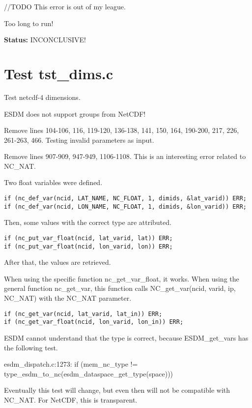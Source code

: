 //TODO This error is out of my league.

Too long to run!

{\bf \large Status: } INCONCLUSIVE!

\section{Test tst\_dims.c}

Test netcdf-4 dimensions.

ESDM does not support groups from NetCDF!

Remove lines 104-106, 116, 119-120, 136-138, 141, 150, 164, 190-200, 217, 226, 261-263, 466. Testing invalid parameters as input.

Remove lines 907-909, 947-949, 1106-1108. This is an interesting error related to NC\_NAT.

Two float variables were defined.

\begin{verbatim}
if (nc_def_var(ncid, LAT_NAME, NC_FLOAT, 1, dimids, &lat_varid)) ERR;
if (nc_def_var(ncid, LON_NAME, NC_FLOAT, 1, dimids, &lon_varid)) ERR;
\end{verbatim}

Then, some values with the correct type are attributed.

\begin{verbatim}
if (nc_put_var_float(ncid, lat_varid, lat)) ERR;
if (nc_put_var_float(ncid, lon_varid, lon)) ERR;
\end{verbatim}

After that, the values are retrieved.

When using the specific function nc\_get\_var\_float, it works. When using the general function nc\_get\_var, this function calls NC\_get\_var(ncid, varid, ip, NC\_NAT) with the NC\_NAT parameter.

\begin{verbatim}
if (nc_get_var(ncid, lat_varid, lat_in)) ERR;
if (nc_get_var_float(ncid, lon_varid, lon_in)) ERR;
\end{verbatim}

ESDM cannot understand that the type is correct, because ESDM\_get\_vars has the following test.

esdm\_dispatch.c:1273: if (mem\_nc\_type != type\_esdm\_to\_nc(esdm\_dataspace\_get\_type(space)))

Eventually this test will change, but even then will not be compatible with NC\_NAT. For NetCDF, this is transparent.

